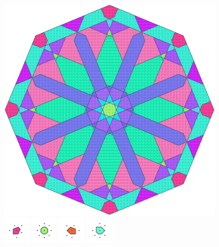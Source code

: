 \documentclass[text.tex]{subfiles}
\begin{document}
\clearpage
\pagestyle{fancy}
\fancyhf{}
\begin{figure}[h!]
\centering
\includegraphics[width=1\textwidth]{img/results/octagon/octagon_107106_(-11_5alpha_1).pdf}
\includegraphics[width=0.12\textwidth]{img/results/octagon/octagon_107106_(-11_5alpha_1)_001.pdf}
\includegraphics[width=0.12\textwidth]{img/results/octagon/octagon_107106_(-11_5alpha_1)_002.pdf}
\includegraphics[width=0.12\textwidth]{img/results/octagon/octagon_107106_(-11_5alpha_1)_003.pdf}
\includegraphics[width=0.12\textwidth]{img/results/octagon/octagon_107106_(-11_5alpha_1)_004.pdf}

\end{figure}
\end{document}
